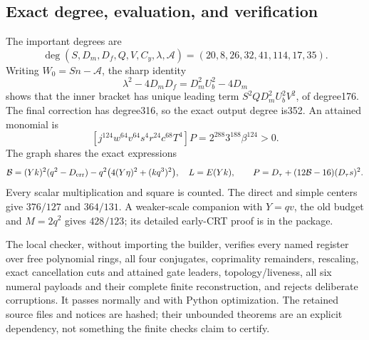 \subsection{Exact degree, evaluation, and verification}
The important degrees are
\[
 \deg(S,D_m,D_f,Q,V,C_y,\lambda,\mathcal A)
       =(20,8,26,32,41,114,17,35).
\]
Writing $W_0=Sn-\mathcal A$, the sharp identity
\[
 \lambda^2-4D_mD_f=D_m^2U_b^2-4D_m
\]
shows that the inner bracket has unique leading term
$S^2QD_m^2U_b^2V^2$, of degree176. The final correction has degree316,
so the exact output degree is352. An attained monomial is
\[
 [j^{124}w^{64}v^{64}s^4r^{24}c^{68}T^4]P
      =2^{288}3^{188}\beta^{124}>0.
\]
The graph shares the exact expressions
\[
 \mathcal B=(Yk)^2(q^2-D_{\rm err})
          -q^2\bigl(4(Y\eta)^2+(kq^3)^2\bigr),\quad L=E(Yk),
 \qquad P=D_\tau+(12\mathcal B-16)(D_\tau s)^2.
\]
Every scalar multiplication and square is counted.
The direct and simple centers give $376/127$ and $364/131$.
A weaker-scale companion with $Y=qv$, the old budget and $M=2q^2$
gives $428/123$; its detailed early-CRT proof is in the package.

The local checker, without importing the builder, verifies every named
register over free polynomial rings, all four conjugates, coprimality
remainders, rescaling, exact cancellation cuts and attained gate leaders,
topology/liveness, all six numeral payloads and their complete finite
reconstruction, and rejects deliberate corruptions. It passes normally
and with Python optimization. The retained source files and notices are
hashed; their unbounded theorems are an explicit dependency, not something
the finite checks claim to certify.
